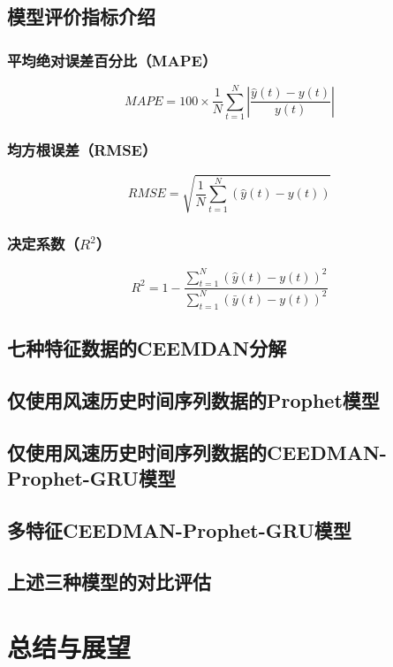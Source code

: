 \documentclass[AutoFakeBold]{LZUThesis}
\begin{document}
\section{模型评价指标介绍}
\subsection{平均绝对误差百分比（MAPE）}
$$MAPE=100\times\frac{1}{N}\sum_{t=1}^{N}\left|\frac{\hat{y}\left(t\right)-y\left(t\right)}{y\left(t\right)}\right|$$

\subsection{均方根误差（RMSE）}
$$RMSE=\sqrt{\frac{1}{N}\sum_{t=1}^{N}\left(\hat{y}\left(t\right)-y\left(t\right)\right)}$$

\subsection{决定系数（$R^2$）}
$$R^2=1-\frac{\sum_{t=1}^{N}(\hat{y}\left(t\right)-y\left(t\right))^2}{\sum_{t=1}^{N}(\bar{y}\left(t\right)-y\left(t\right))^2}$$

\section{七种特征数据的CEEMDAN分解}

\section{仅使用风速历史时间序列数据的Prophet模型}

\section{仅使用风速历史时间序列数据的CEEDMAN-Prophet-GRU模型}

\section{多特征CEEDMAN-Prophet-GRU模型}

\section{上述三种模型的对比评估}


\chapter{总结与展望}
\end{document}
